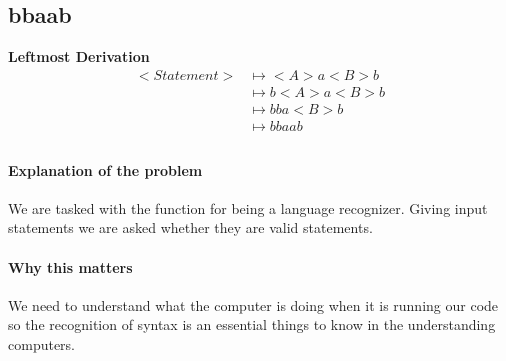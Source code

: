 \subsection{bbaab}
\textbf{Leftmost Derivation}
\begin{align*}
	<Statement> &\mapsto <A> a <B> b \\
	&\mapsto b <A> a <B> b \\
	&\mapsto b b a <B> b \\
	&\mapsto b b a a b \\
\end{align*}

\paragraph{Explanation of the problem} We are tasked with the function for being a language recognizer. Giving input statements we are asked whether they are valid statements. 

\paragraph{Why this matters} We need to understand what the computer is doing when it is running our code so the recognition of syntax is an essential things to know in the understanding computers. 
